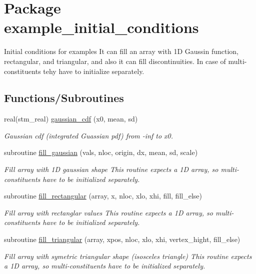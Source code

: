 \hypertarget{a00059}{
\section{Package example\_\-initial\_\-conditions}
\label{a00059}
}
Initial conditions for examples It can fill an array with 1D Gaussin function, rectangular, and triangular, and also it can fill discontinuities. In case of multi-constituents tehy have to initialize separately.  


\subsection*{Functions/Subroutines}
\begin{CompactItemize}
\item 
real(stm\_\-real) \hyperlink{a00059_1a28e5a6ef3e6bb0552f3cd0a195fb6f}{gaussian\_\-cdf} (x0, mean, sd)
\begin{CompactList}\small\item\em Gaussian cdf (integrated Guassian pdf) from -inf to x0. \item\end{CompactList}\item 
subroutine \hyperlink{a00059_82460386f586c07daecf8f604347e82b}{fill\_\-gaussian} (vals, nloc, origin, dx, mean, sd, scale)
\begin{CompactList}\small\item\em Fill array with 1D gaussian shape This routine expects a 1D array, so multi-constituents have to be initialized separately. \item\end{CompactList}\item 
subroutine \hyperlink{a00059_2c5f8860d37203d2477701c003e4afa3}{fill\_\-rectangular} (array, x, nloc, xlo, xhi, fill, fill\_\-else)
\begin{CompactList}\small\item\em Fill array with rectanglar values This routine expects a 1D array, so multi-constituents have to be initialized separately. \item\end{CompactList}\item 
subroutine \hyperlink{a00059_c94c30ffbfa4a942dc74dbe5bcf85b32}{fill\_\-triangular} (array, xpos, nloc, xlo, xhi, vertex\_\-hight, fill\_\-else)
\begin{CompactList}\small\item\em Fill array with symetric triangular shape (isosceles triangle) This routine expects a 1D array, so multi-constituents have to be initialized separately. \item\end{CompactList}\item 

\end{CompactItemize}
